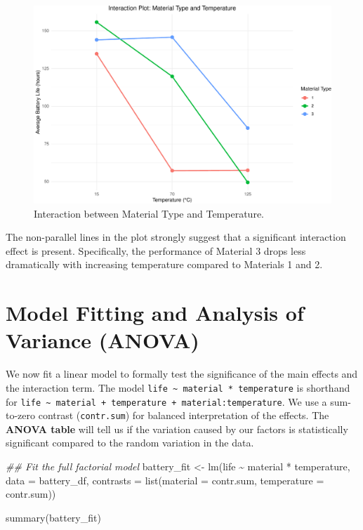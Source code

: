 \documentclass[
  letterpaper,
]{scrbook}
\newenvironment{Shaded}{\begin{snugshade}}{\end{snugshade}}
\newcommand{\AttributeTok}[1]{\textcolor[rgb]{0.40,0.45,0.13}{#1}}
\newcommand{\DocumentationTok}[1]{\textcolor[rgb]{0.37,0.37,0.37}{\textit{#1}}}
\newcommand{\FunctionTok}[1]{\textcolor[rgb]{0.28,0.35,0.67}{#1}}
\newcommand{\NormalTok}[1]{\textcolor[rgb]{0.00,0.23,0.31}{#1}}
\newcommand{\OtherTok}[1]{\textcolor[rgb]{0.00,0.23,0.31}{#1}}
\newcommand{\SpecialCharTok}[1]{\textcolor[rgb]{0.37,0.37,0.37}{#1}}
\begin{document}
\begin{figure}[H]

{\centering \includegraphics{unit6-factorial/factorial_files/figure-pdf/plot-interaction-1.pdf}

}

\caption{Interaction between Material Type and Temperature.}

\end{figure}%

The non-parallel lines in the plot strongly suggest that a significant
interaction effect is present. Specifically, the performance of Material
3 drops less dramatically with increasing temperature compared to
Materials 1 and 2.

\section{Model Fitting and Analysis of Variance
(ANOVA)}\label{model-fitting-and-analysis-of-variance-anova}

We now fit a linear model to formally test the significance of the main
effects and the interaction term. The model
\texttt{life\ \textasciitilde{}\ material\ *\ temperature} is shorthand
for
\texttt{life\ \textasciitilde{}\ material\ +\ temperature\ +\ material:temperature}.
We use a sum-to-zero contrast (\texttt{contr.sum}) for balanced
interpretation of the effects. The \textbf{ANOVA table} will tell us if
the variation caused by our factors is statistically significant
compared to the random variation in the data.

\begin{Shaded}
\begin{Highlighting}[]
\DocumentationTok{\#\# Fit the full factorial model}
\NormalTok{battery\_fit }\OtherTok{\textless{}{-}} \FunctionTok{lm}\NormalTok{(life }\SpecialCharTok{\textasciitilde{}}\NormalTok{ material }\SpecialCharTok{*}\NormalTok{ temperature, }
                  \AttributeTok{data =}\NormalTok{ battery\_df,}
                  \AttributeTok{contrasts =} \FunctionTok{list}\NormalTok{(}\AttributeTok{material =}\NormalTok{ contr.sum, }\AttributeTok{temperature =}\NormalTok{ contr.sum))}

\FunctionTok{summary}\NormalTok{(battery\_fit)}
\end{Highlighting}
\end{Shaded}
\end{document}
